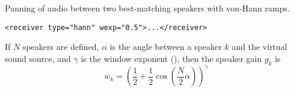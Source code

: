 Panning of audio between two best-matching speakers with von-Hann
ramps.

\begin{lstlisting}[numbers=none]
<receiver type="hann" wexp="0.5">...</receiver>
\end{lstlisting}
If $N$ speakers are defined, $\alpha$ is the angle between a speaker
$k$ and the virtual sound source, and $\gamma$ is the window exponent
(), then the speaker gain $g_k$ is
\begin{equation}
w_k = \left(\frac12 + \frac12 \cos\left(\frac{N}{2} \alpha\right)\right)^\gamma
\end{equation}

